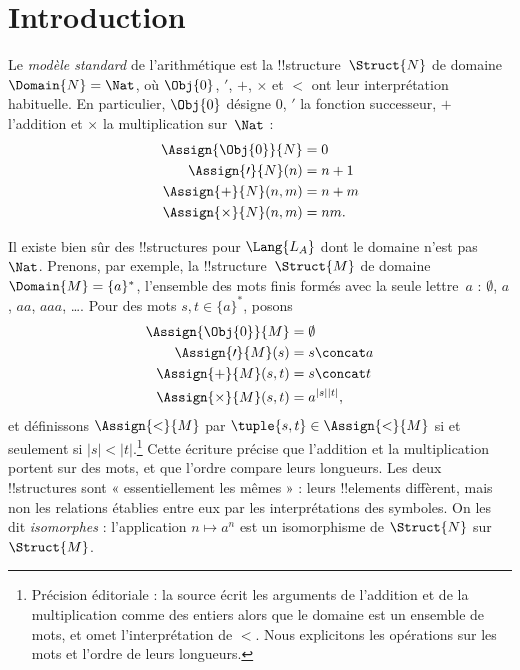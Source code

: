 \documentclass[../../../include/open-logic-section]{subfiles}
\begin{document}
\section{Introduction}

Le \emph{modèle standard} de l'arithmétique est la
!!{structure}~$\Struct{N}$ de domaine $\Domain{N}=\Nat$, où
$\Obj{0}$, $\prime$, $+$, $\times$ et $<$ ont leur interprétation
habituelle. En particulier, $\Obj{0}$ désigne $0$, $\prime$
la fonction successeur, $+$ l'addition et $\times$ la
multiplication sur~$\Nat$ :
\begin{align*}
  \Assign{\Obj{0}}{N} & = 0\\
  \Assign{\prime}{N}(n) & = n+1\\
  \Assign{+}{N}(n,m) & = n+m\\
  \Assign{\times}{N}(n,m) & = nm.
\end{align*}

Il existe bien sûr des !!{structure}s pour $\Lang{L_A}$ dont
le domaine n'est pas~$\Nat$. Prenons, par exemple, la
!!{structure}~$\Struct{M}$ de domaine
$\Domain{M}=\{a\}^*$, l'ensemble des mots finis formés avec
la seule lettre~$a$ : $\emptyset$, $a$, $aa$, $aaa$, \dots.
Pour des mots $s,t\in\{a\}^*$, posons
\begin{align*}
  \Assign{\Obj{0}}{M} & = \emptyset\\
  \Assign{\prime}{M}(s) & = s\concat a\\
  \Assign{+}{M}(s,t) & = s\concat t\\
  \Assign{\times}{M}(s,t) & = a^{|s||t|},
\end{align*}
et définissons $\Assign{<}{M}$ par
$\tuple{s,t}\in\Assign{<}{M}$ si et seulement
si $|s|<|t|$.\footnote{Précision éditoriale : la source écrit les arguments de l'addition et de la multiplication comme des entiers alors que le domaine est un ensemble de mots, et omet l'interprétation de $<$. Nous explicitons les opérations sur les mots et l'ordre de leurs longueurs.}
Cette écriture précise que l'addition et la multiplication
portent sur des mots, et que l'ordre compare leurs longueurs.
Les deux !!{structure}s sont « essentiellement les mêmes » :
leurs !!{element}s diffèrent, mais non les relations établies
entre eux par les interprétations des symboles. On les dit
\emph{isomorphes} : l'application $n\mapsto a^n$ est un
isomorphisme de $\Struct{N}$ sur~$\Struct{M}$.
\end{document}
